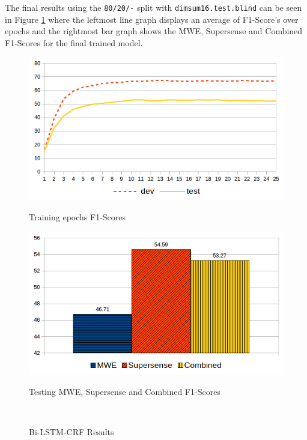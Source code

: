 The final results using the \texttt{80/20/-} split with \texttt{dimsum16.test.blind} can be seen in Figure \ref{fig:bilstmcrfresults} where the leftmost line graph displays an average of F1-Score's over epochs and the rightmost bar graph shows the MWE, Supersense and Combined F1-Scores for the final trained model. 
\begin{figure}[H]
  \begin{minipage}{.5\textwidth}
    \includegraphics[width=\textwidth]{images/bi_lstm_crf_80_20_final_epochs_line_graph.png}
    \centerline{\footnotesize Training epochs F1-Scores}\medskip
  \end{minipage}\hfill
  \begin{minipage}{.5\textwidth}
    \includegraphics[width=\textwidth]{images/bi_lstm_crf_80_20_final_f1scores_bar_graph.png}
    \centerline{\footnotesize Testing MWE, Supersense and Combined F1-Scores}\medskip
  \end{minipage}\\
  \caption{Bi-LSTM-CRF Results}
  \label{fig:bilstmcrfresults}
\end{figure}

